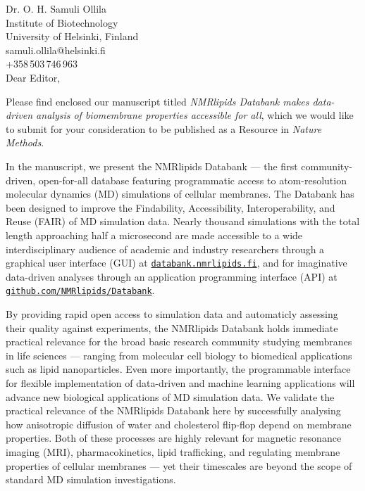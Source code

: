 \documentclass[11pt]{letter}
\begin{document}
\reversemarginpar
\pagestyle{empty}
\noindent Dr. O. H. Samuli Ollila \\
\noindent Institute of Biotechnology \\
\noindent University of Helsinki, Finland \\
\noindent samuli.ollila@helsinki.fi\\
\noindent +358\,503\,746\,963 \\


Dear Editor,

Please find enclosed our manuscript titled
{\it NMRlipids Databank makes data-driven analysis of biomembrane properties accessible for all}, which we would like to submit for your consideration to be published as a Resource in \textit{Nature Methods}.

In the manuscript, we present the NMRlipids Databank --- the first community-driven, open-for-all database featuring programmatic access to atom-resolution molecular dynamics (MD) simulations of cellular membranes. The Databank has been designed to improve the Findability, Accessibility, Interoperability, and Reuse (FAIR) of MD simulation data. Nearly thousand simulations with the total length approaching half a microsecond are made accessible to a wide interdisciplinary audience of academic and industry researchers through a graphical user interface (GUI) at \href{https://databank.nmrlipids.fi/}{\tt databank.nmrlipids.fi}, and for imaginative data-driven analyses through an application programming interface (API) at \href{https://github.com/NMRlipids/Databank}{\tt github.com/NMRlipids/Databank}.

By providing rapid open access to simulation data and automaticly  assessing
their quality against experiments, the NMRlipids Databank holds immediate practical relevance for the broad basic research community studying membranes in life sciences --- ranging from molecular cell biology to biomedical applications such as lipid nanoparticles. Even more importantly, the programmable interface for flexible implementation of data-driven and machine learning applications will advance new biological applications of MD simulation data.
We validate the practical relevance of the NMRlipids Databank here by successfully analysing how anisotropic diffusion of water and cholesterol flip-flop depend on membrane properties. Both of these processes are highly relevant for magnetic resonance imaging (MRI), pharmacokinetics, lipid trafficking, and regulating membrane properties of cellular membranes --- yet their timescales are beyond the scope of standard MD simulation investigations. 
\end{document}
